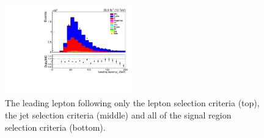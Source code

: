 \begin{figure}[ht]
\includegraphics[width=0.49\textwidth]{figs/background-estimation/plots/unblinded/prompt_mumu_ttbarInc/lep1Pt_NPL_mumu_wMass_mumu.pdf}
\caption{
The leading lepton \pT following only the lepton selection criteria (top), the jet selection criteria (middle) and all of the signal region selection criteria (bottom).
}
\label{fig:App_SR_lep1Pt}
\end{figure}

